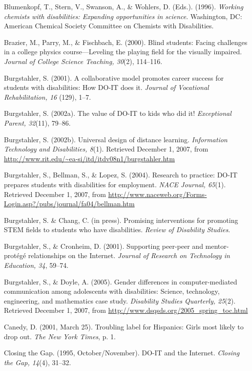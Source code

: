 \documentclass[11.5pt]{sig-alternate} %
\begin{document}
Blumenkopf, T., Stern, V., Swanson, A., \& Wohlers, D. (Eds.). (1996). \textit{Working chemists with disabilities: Expanding opportunities in science}. Washington, DC: American Chemical Society Committee on Chemists with Disabilities.  
 
Brazier, M., Parry, M., \& Fischbach, E. (2000). Blind students: Facing challenges in a college physics course—Lev\-eling the playing field for the visually impaired. \textit{Journal of College Science Teaching, 30}(2), 114–116.  
 
Burgstahler, S. (2001). A collaborative model promotes career success for students with disabilities: How DO-IT does it. \textit{Journal of Vocational Rehabilitation, 16} (129), 1–7. 
 
Burgstahler, S. (2002a). The value of DO-IT to kids who did it! \textit{Exceptional Parent, 32}(11), 79–86.  
 
Burgstahler, S. (2002b). Universal design of distance learning. \textit{Information Technology and Disabilities, 8}(1). Retrieved December 1, 2007, from \url{http://www.rit.edu/~ea-si/itd/itdv08n1/burgstahler.htm}  
 
Burgstahler, S., Bellman, S., \& Lopez, S. (2004). Research to practice: DO-IT prepares students with disabilities for employment. \textit{NACE Journal, 65}(1). Retrieved December 1, 2007, from \url{http://www.naceweb.org/Forms-Login.asp?/pubs/journal/fa04/bellman.htm}
 
Burgstahler, S. \& Chang, C. (in press). Promising interventions for promoting STEM fields to students who have disabilities. 
\textit{Review of Disability Studies}. 
 
Burgstahler, S., \& Cronheim, D. (2001). Supporting peer-peer and mentor-protégé relationships on the Internet. \textit{Journal of Research on Technology in Education, 34}, 59–74.
 
Burgstahler, S., \& Doyle, A. (2005). Gender differences in computer-mediated communication among adolescents with disabilities: Science, technology, engineering, and mathematics case study. \textit{Disability Studies Quarterly, 25}(2). Retrieved December 1, 2007, from \url{http://www.dsqsds.org/2005\_spring\_toc.html}
 
Canedy, D. (2001, March 25). Troubling label for Hispanics: Girls most likely to drop out. \textit{The New York Times}, p. 1. 
 
Closing the Gap. (1995, October/November). DO-IT and the Internet. \textit{Closing the Gap, 14}(4), 31–32. 
 
\end{document}

